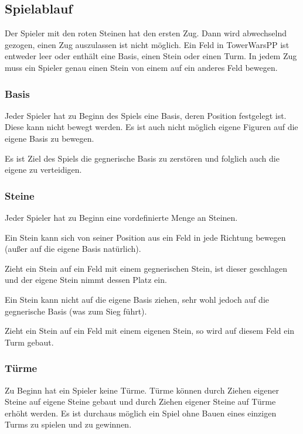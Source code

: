\subsection*{Spielablauf}
Der Spieler mit den roten Steinen hat den ersten Zug. Dann wird abwechselnd gezogen, einen Zug auszulassen ist nicht möglich. Ein Feld in TowerWarsPP ist entweder leer oder enthält eine Basis, einen Stein oder einen Turm. In jedem Zug muss ein Spieler genau einen Stein von einem auf ein anderes Feld bewegen.

\subsubsection*{Basis}
Jeder Spieler hat zu Beginn des Spiels eine Basis, deren Position festgelegt ist. Diese kann nicht bewegt werden. Es ist auch nicht möglich eigene Figuren auf die eigene Basis zu bewegen.

Es ist Ziel des Spiels die gegnerische Basis zu zerstören und folglich auch die eigene zu verteidigen.

\subsubsection*{Steine}
Jeder Spieler hat zu Beginn eine vordefinierte Menge an Steinen. 

Ein Stein kann sich von seiner Position aus ein Feld in jede Richtung bewegen (außer auf die eigene Basis natürlich).

Zieht ein Stein auf ein Feld mit einem gegnerischen Stein, ist dieser geschlagen und der eigene Stein nimmt dessen Platz ein.

Ein Stein kann nicht auf die eigene Basis ziehen, sehr wohl jedoch auf die gegnerische Basis (was zum Sieg führt).

Zieht ein Stein auf ein Feld mit einem eigenen Stein, so wird auf diesem Feld ein Turm gebaut.

\subsubsection*{Türme}
Zu Beginn hat ein Spieler keine Türme. Türme können durch Ziehen eigener Steine auf eigene Steine gebaut und durch Ziehen eigener Steine auf Türme erhöht werden. Es ist durchaus möglich ein Spiel ohne Bauen eines einzigen Turms zu spielen und zu gewinnen.

